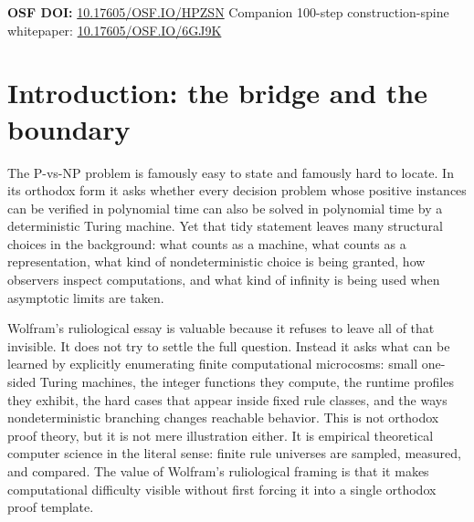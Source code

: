 \documentclass{pantarhei-researchnote}
\newcommand{\Wolfram}{Wolfram}
\begin{document}
\maketitle

\begin{center}\small\noindent
\textbf{OSF DOI:}\enspace
\href{https://doi.org/10.17605/OSF.IO/HPZSN}{10.17605/OSF.IO/HPZSN}
\enspace\textbar\enspace Companion 100-step construction-spine whitepaper:
\href{https://doi.org/10.17605/OSF.IO/6GJ9K}{10.17605/OSF.IO/6GJ9K}
\end{center}
\vspace{0.5em}

\section{Introduction: the bridge and the boundary}
\label{sec:intro}

The P-vs-NP problem is famously easy to state and famously hard to locate.
In its orthodox form it asks whether every decision problem whose positive
instances can be verified in polynomial time can also be solved in
polynomial time by a deterministic Turing machine. Yet that tidy statement
leaves many structural choices in the background: what counts as a
machine, what counts as a representation, what kind of nondeterministic
choice is being granted, how observers inspect computations, and what
kind of infinity is being used when asymptotic limits are taken.

\Wolfram's ruliological essay is valuable because it refuses to leave all
of that invisible. It does not try to settle the full question. Instead it
asks what can be learned by explicitly enumerating finite computational
microcosms: small one-sided Turing machines, the integer functions they
compute, the runtime profiles they exhibit, the hard cases that appear
inside fixed rule classes, and the ways nondeterministic branching changes
reachable behavior. This is not orthodox proof theory, but it is not mere
illustration either. It is empirical theoretical computer science in the
literal sense: finite rule universes are sampled, measured, and compared.
The value of Wolfram's ruliological framing is that it makes
computational difficulty visible without first forcing it into a single
orthodox proof template.
\end{document}
